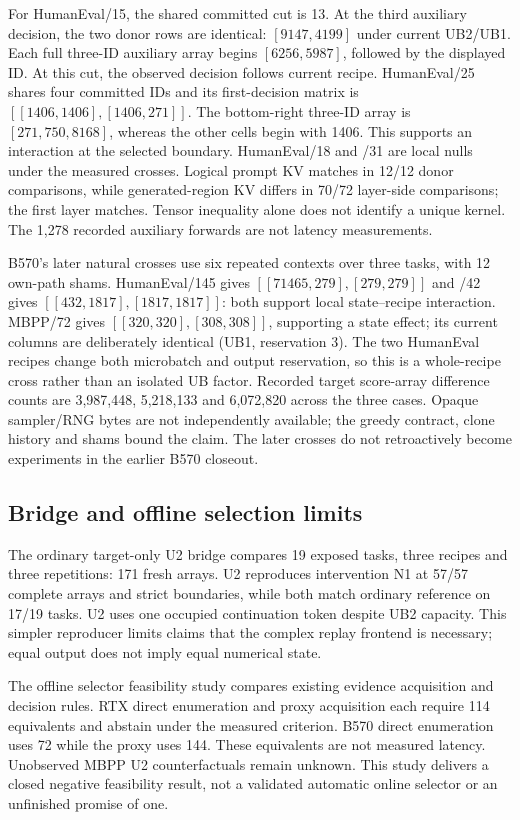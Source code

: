 For HumanEval/15, the shared committed cut is 13. At the third auxiliary decision, the two donor rows are identical: $[9147,4199]$ under current UB2/UB1. Each full three-ID auxiliary array begins $[6256,5987]$, followed by the displayed ID. At this cut, the observed decision follows current recipe. HumanEval/25 shares four committed IDs and its first-decision matrix is $[[1406,1406],[1406,271]]$. The bottom-right three-ID array is $[271,750,8168]$, whereas the other cells begin with 1406. This supports an interaction at the selected boundary. HumanEval/18 and /31 are local nulls under the measured crosses. Logical prompt KV matches in 12/12 donor comparisons, while generated-region KV differs in 70/72 layer-side comparisons; the first layer matches. Tensor inequality alone does not identify a unique kernel. The 1,278 recorded auxiliary forwards are not latency measurements.

B570's later natural crosses use six repeated contexts over three tasks, with 12 own-path shams. HumanEval/145 gives $[[71465,279],[279,279]]$ and /42 gives $[[432,1817],[1817,1817]]$: both support local state--recipe interaction. MBPP/72 gives $[[320,320],[308,308]]$, supporting a state effect; its current columns are deliberately identical (UB1, reservation 3). The two HumanEval recipes change both microbatch and output reservation, so this is a whole-recipe cross rather than an isolated UB factor. Recorded target score-array difference counts are 3,987,448, 5,218,133 and 6,072,820 across the three cases. Opaque sampler/RNG bytes are not independently available; the greedy contract, clone history and shams bound the claim. The later crosses do not retroactively become experiments in the earlier B570 closeout.

\subsection{Bridge and offline selection limits}
The ordinary target-only U2 bridge compares 19 exposed tasks, three recipes and three repetitions: 171 fresh arrays. U2 reproduces intervention N1 at 57/57 complete arrays and strict boundaries, while both match ordinary reference on 17/19 tasks. U2 uses one occupied continuation token despite UB2 capacity. This simpler reproducer limits claims that the complex replay frontend is necessary; equal output does not imply equal numerical state.

The offline selector feasibility study compares existing evidence acquisition and decision rules. RTX direct enumeration and proxy acquisition each require 114 equivalents and abstain under the measured criterion. B570 direct enumeration uses 72 while the proxy uses 144. These equivalents are not measured latency. Unobserved MBPP U2 counterfactuals remain unknown. This study delivers a closed negative feasibility result, not a validated automatic online selector or an unfinished promise of one.
